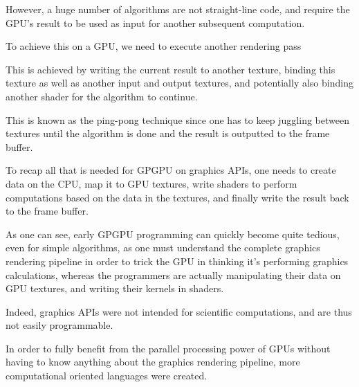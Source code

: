\documentclass[10pt, a4paper]{report}
\begin{document}
However, a huge number of algorithms are not straight-line code, and require the
GPU's result to be used as input for another subsequent computation.

To achieve this on a GPU, we need to execute another rendering pass

This is achieved by writing the current result to another texture, binding this
texture as well as another input and output textures, and potentially also
binding another shader for the algorithm to continue.

This is known as the ping-pong technique since one has to keep juggling between
textures until the algorithm is done and the result is outputted to the frame
buffer.

To recap all that is needed for GPGPU on graphics APIs, one needs to create data
on the CPU, map it to GPU textures, write shaders to perform computations based
on the data in the textures, and finally write the result back to the frame
buffer.

As one can see, early GPGPU programming can quickly become quite tedious, even
for simple algorithms, as one must understand the complete graphics rendering
pipeline in order to trick the GPU in thinking it's performing graphics
calculations, whereas the programmers are actually manipulating their data on
GPU textures, and writing their kernels in shaders.

Indeed, graphics APIs were not intended for scientific computations, and are
thus not easily programmable.

In order to fully benefit from the parallel processing power of GPUs without
having to know anything about the graphics rendering pipeline, more
computational oriented languages were created.




\end{document}
